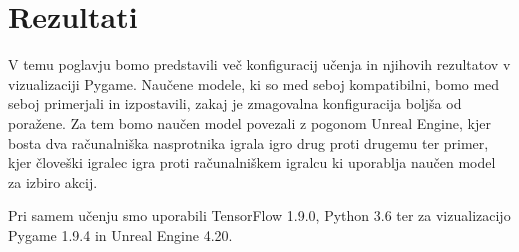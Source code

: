 \documentclass[a4paper, 12pt]{book}
\begin{document}
\chapter{Rezultati}
\label{chrezultati}

V temu poglavju bomo predstavili več konfiguracij učenja in njihovih rezultatov v vizualizaciji Pygame.
Naučene modele, ki so med seboj kompatibilni, bomo med seboj primerjali in izpostavili, zakaj je zmagovalna konfiguracija boljša od poražene.
Za tem bomo naučen model povezali z pogonom Unreal Engine, kjer bosta dva računalniška nasprotnika igrala igro drug proti drugemu ter primer, kjer človeški igralec igra proti računalniškem igralcu ki uporablja naučen model za izbiro akcij.

Pri samem učenju smo uporabili  TensorFlow 1.9.0, Python 3.6 ter za vizualizacijo Pygame 1.9.4 in Unreal Engine 4.20.
\end{document}
